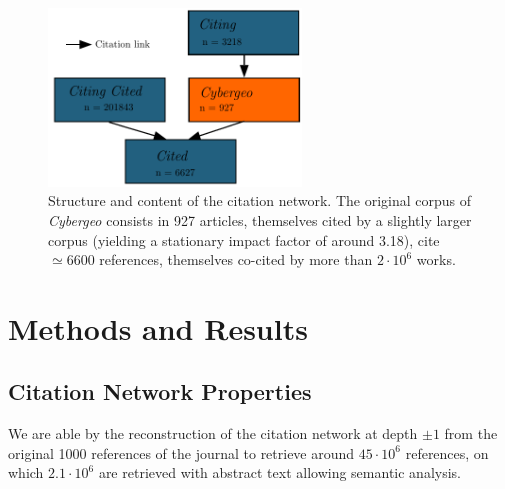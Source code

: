 \begin{figure}
\centering
\includegraphics[width=0.6\textwidth]{figures/citnw}
\caption{Structure and content of the citation network. The original corpus of \emph{Cybergeo} consists in 927 articles, themselves cited by a slightly larger corpus (yielding a stationary impact factor of around 3.18), cite $\simeq 6600$ references, themselves co-cited by more than $2\cdot 10^6$ works.}
\label{fig:citationnetwork}
\end{figure}









\section{Methods and Results}
\label{sec:results}



\subsection{Citation Network Properties}


We are able by the reconstruction of the citation network at depth $\pm 1$ from the original 1000 references of the journal to retrieve around $45\cdot 10^6$ references, on which $2.1\cdot 10^6$ are retrieved with abstract text allowing semantic analysis. 




